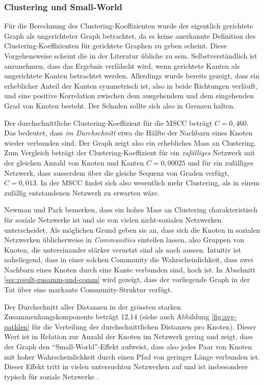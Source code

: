 \subsubsection{Clustering und Small-World}
\label{sec:clustering-und-small}

F\"ur die Berechnung des Clustering-Koeffizienten wurde der eigentlich
gerichtete Graph als ungerichteter Graph betrachtet, da es keine
anerkannte Definition des Clustering-Koeffizienten f\"ur gerichtete
Graphen zu geben scheint. Diese Vorgehensweise scheint die in der
Literatur \"ubliche zu sein. Selbstverst\"andlich ist anzunehmen, dass
das Ergebnis verf\"alscht wird, wenn gerichtete Kanten als
ungerichtete Kanten betrachtet werden. Allerdings wurde bereits
gezeigt, dass ein erheblicher Anteil der Kanten symmetrisch ist, also
in beide Richtungen verl\"auft, und eine positive Korrelation zwischen
dem ausgehendem und dem eingehenden Grad von Knoten besteht. Der
Schaden sollte sich also in Grenzen halten.

Der durchschnittliche Clustering-Koeffizient f\"ur die MSCC betr\"agt
$C = 0,460$. Das bedeutet, dass \emph{im Durchschnitt} etwa die
H\"alfte der Nachbarn eines Knoten wieder verbunden sind. Der Graph
zeigt also ein erhebliches Mass an Clustering. Zum Vergleich betr\"agt
der Clustering-Koeffizient f\"ur ein \emph{zuf\"alliges} Netzwerk mit
der gleichen Anzahl von Knoten und Kanten $C = 0,00025$ und f\"ur ein
zuf\"alliges Netzwerk, dass ausserdem \"uber die gleiche Sequenz von
Graden verf\"ugt, $C = 0,013$. In der MSCC findet sich also wesentlich
mehr Clustering, als in einem zuf\"allig entstandenen Netzwerk zu
erwarten w\"are.

Newman und Park bemerken, dass ein hohes Mass an Clustering
charakteristisch f\"ur soziale Netzwerke ist und sie von vielen
nicht-sozialen Netzwerken unterscheidet\cite{PhysRevE.68.036122}. Als
m\"oglichen Grund geben sie an, dass sich die Knoten in sozialen
Netzwerken \"ublicherweise in \emph{Communities} einteilen lassen,
also Gruppen von Knoten, die untereinander st\"arker vernetzt sind als
nach aussen. Intuitiv ist naheliegend, dass in einer solchen Community
die Wahrscheinlichkeit, dass zwei Nachbarn eines Knoten durch eine
Kante verbunden sind, hoch ist. In Abschnitt
\ref{sec:result-zusamm-und-comm} wird gezeigt, dass der vorliegende
Graph in der Tat \"uber eine markante Community-Struktur verf\"ugt.

Der Durchschnitt aller Distanzen in der gr\"ossten starken
Zusammenhangskomponente betr\"agt 12,14 (siehe auch Abbildung
\ref{fig:avg-pathlen} f\"ur die Verteilung der durchschnittlichen
Distanzen pro Knoten). Dieser Wert ist in Relation zur Anzahl der
Knoten im Netzwerk gering und zeigt, dass der Graph den
``Small-World''-Effekt aufweist, dass also jedes Paar von Knoten mit
hoher Wahrscheinlichkeit durch einen Pfad von geringer L\"ange
verbunden ist. Dieser Effekt tritt in vielen untersuchten Netzwerken
auf und ist insbesondere typisch f\"ur soziale Netzwerke
\cite{newman:167}.

